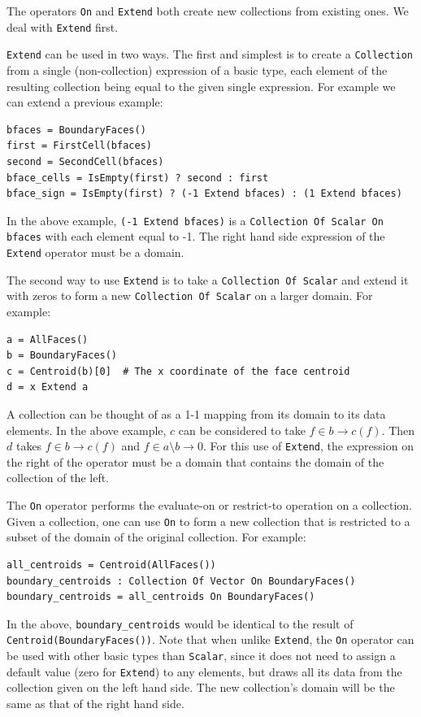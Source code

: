 \documentclass[11pt]{article}
\newcommand{\code}[1]{\texttt{#1}}
\begin{document}
The operators \code{On} and \code{Extend} both create new collections from existing
ones. We deal with \code{Extend} first.

\code{Extend} can be used in two ways. The first and simplest is to create a
\code{Collection} from a single (non-collection) expression of a basic type, each element
of the resulting collection being equal to the given single expression. For example we can
extend a previous example:

\begin{verbatim}
bfaces = BoundaryFaces()
first = FirstCell(bfaces)
second = SecondCell(bfaces)
bface_cells = IsEmpty(first) ? second : first
bface_sign = IsEmpty(first) ? (-1 Extend bfaces) : (1 Extend bfaces)
\end{verbatim}

In the above example, \code{(-1 Extend bfaces)} is a \code{Collection Of Scalar On bfaces}
with each element equal to -1. The right hand side expression of the \code{Extend}
operator must be a domain.

The second way to use \code{Extend} is to take a \code{Collection Of Scalar} and extend it
with zeros to form a new \code{Collection Of Scalar} on a larger domain. For example:

\begin{verbatim}
a = AllFaces()
b = BoundaryFaces()
c = Centroid(b)[0]  # The x coordinate of the face centroid
d = x Extend a
\end{verbatim}

A collection can be thought of as a 1-1 mapping from its domain to its data elements. In
the above example, $c$ can be considered to take $f \in b \to c(f)$. Then $d$ takes $f \in
b \to c(f)$ and $f \in a\setminus b \to 0$. For this use of \code{Extend}, the expression
on the right of the operator must be a domain that contains the domain of the collection
of the left.

The \code{On} operator performs the evaluate-on or restrict-to operation on a
collection. Given a collection, one can use \code{On} to form a new collection that is
restricted to a subset of the domain of the original collection. For example:

\begin{verbatim}
all_centroids = Centroid(AllFaces())
boundary_centroids : Collection Of Vector On BoundaryFaces()
boundary_centroids = all_centroids On BoundaryFaces()
\end{verbatim}

In the above, \code{boundary\_centroids} would be identical to the result of
\code{Centroid(BoundaryFaces())}. Note that when unlike \code{Extend}, the \code{On} operator
can be used with other basic types than \code{Scalar}, since it does not need to assign a
default value (zero for \code{Extend}) to any elements, but draws all its data from the
collection given on the left hand side. The new collection's domain will be the same as
that of the right hand side.
\end{document}
